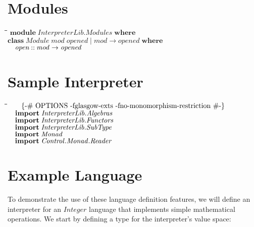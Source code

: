 \documentclass[10pt]{article}
\newlength{\lwidth}\setlength{\lwidth}{4.5cm}
\newlength{\cwidth}\setlength{\cwidth}{8mm} %
\newcommand{\Conid}[1]{\mathit{#1}}
\newcommand{\Varid}[1]{\mathit{#1}}
\begin{document}
\section{Modules}
\begin{tabbing}
\qquad\=\hspace{\lwidth}\=\hspace{\cwidth}\=\+\kill
${\mathbf{module}\;\Conid{\Conid{InterpreterLib}.Modules}\;\mathbf{where}}$\\
${}$\\
${\mathbf{class}\;\Conid{Module}\;\Varid{mod}\;\Varid{opened}\mid \Varid{mod}\to \Varid{opened}\;\mathbf{where}}$\\
${\hskip1.00em\relax\Varid{open}\mathbin{::}\Varid{mod}\to \Varid{opened}}$
\end{tabbing}
\section{Sample Interpreter}
\begin{tabbing}
\qquad\=\hspace{\lwidth}\=\hspace{\cwidth}\=\+\kill
${\hskip1.00em\relax\mbox{\enskip\{-\# OPTIONS -fglasgow-exts -fno-monomorphism-restriction  \#-\}\enskip}}$\\
${\hskip1.00em\relax\mathbf{import}\;\Conid{\Conid{InterpreterLib}.Algebras}}$\\
${\hskip1.00em\relax\mathbf{import}\;\Conid{\Conid{InterpreterLib}.Functors}}$\\
${\hskip1.00em\relax\mathbf{import}\;\Conid{\Conid{InterpreterLib}.SubType}}$\\
${\hskip1.00em\relax\mathbf{import}\;\Conid{Monad}}$\\
${\hskip1.00em\relax\mathbf{import}\;\Conid{\Conid{Control}.\Conid{Monad}.Reader}}$
\end{tabbing}
\section{Example Language}

To demonstrate the use of these language definition features, we will
define an interpreter for an \ensuremath{\Conid{Integer}} language that implements simple
mathematical operations.  We start by defining a type for the
interpreter's value space:
\end{document}
